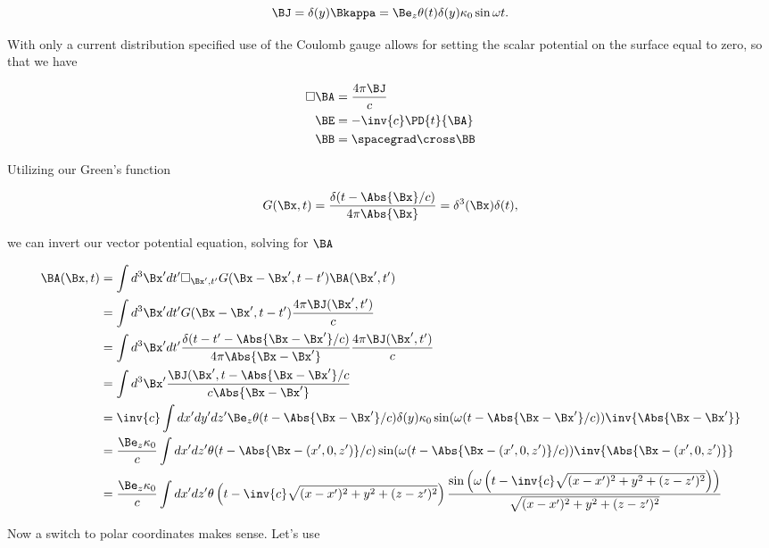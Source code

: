 \begin{equation}\label{eqn:relElectroDynProblemSet5P1:30}
\BJ = \delta(y) \Bkappa = \Be_z \theta(t) \delta(y) \kappa_0 \sin\omega t.
\end{equation}

With only a current distribution specified use of the Coulomb gauge allows for setting the scalar potential on the surface equal to zero, so that we have

\begin{align}\label{eqn:relElectroDynProblemSet5P1:50}
\square \BA &= \frac{4 \pi \BJ}{c} \\
\BE &= - \inv{c} \PD{t}{\BA} \\
\BB &= \spacegrad \cross \BB
\end{align}

Utilizing our Green's function 

\begin{equation}\label{eqn:relElectroDynProblemSet5P1:70}
G(\Bx, t) = \frac{\delta(t - \Abs{\Bx}/c)}{4 \pi \Abs{\Bx}} = \delta^3(\Bx)\delta(t),
\end{equation}

we can invert our vector potential equation, solving for $\BA$

\begin{align*}
\BA(\Bx, t) 
&= \int d^3 \Bx' dt' \square_{\Bx', t'} G(\Bx - \Bx', t - t') \BA(\Bx', t') \\
&= \int d^3 \Bx' dt' G(\Bx - \Bx', t - t') \frac{4 \pi \BJ(\Bx', t')}{c} \\
&= \int d^3 \Bx' dt' 
\frac{\delta(t - t' - \Abs{\Bx -\Bx'}/c)}{4 \pi \Abs{\Bx - \Bx'}}
\frac{4 \pi \BJ(\Bx', t')}{c} \\
&= \int d^3 \Bx' 
\frac{\BJ(\Bx', t - \Abs{\Bx - \Bx'}/c}{c \Abs{\Bx - \Bx'}} \\
&= \inv{c} \int dx' dy' dz'
\Be_z \theta(t - \Abs{\Bx -\Bx'}/c) \delta(y) \kappa_0 \sin(\omega(t - \Abs{\Bx -\Bx'}/c))
\inv{\Abs{\Bx - \Bx'}} \\
&= \frac{
\Be_z \kappa_0
}{c} \int dx' dz'
\theta(t - \Abs{\Bx -(x', 0, z')}/c) 
\sin(\omega(t - \Abs{\Bx -(x', 0, z')}/c))
\inv{\Abs{\Bx - (x', 0, z')}} \\
&= \frac{
\Be_z \kappa_0
}{c} \int dx' dz'
\theta\left(t - \inv{c} \sqrt{(x-x')^2 + y^2 + (z-z')^2}\right) 
\frac{\sin\left(\omega\left(t - \inv{c} \sqrt{(x-x')^2 + y^2 + (z-z')^2}\right)\right)}{\sqrt{(x-x')^2 + y^2 + (z-z')^2}}
\end{align*}

Now a switch to polar coordinates makes sense.  Let's use

